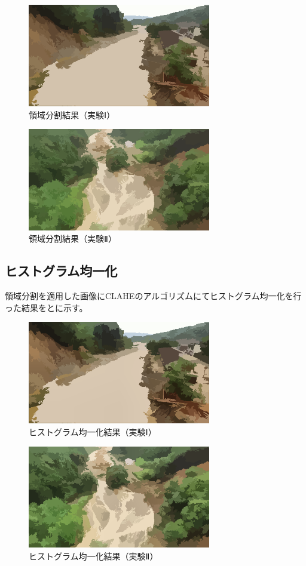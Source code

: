 \documentclass[../Thesis]{subfiles}
\begin{document}
\begin{figure}[h]
	\centering
	\includegraphics[width=8cm]{img/meanshift1.png}
	\caption{領域分割結果（実験Ⅰ）}
	\label{img03}
\end{figure}
\begin{figure}[h]
	\centering
	\includegraphics[width=8cm]{img/meanshift2.png}
	\caption{領域分割結果（実験Ⅱ）}
	\label{img04}
\end{figure}


\subsection{ヒストグラム均一化}
領域分割を適用した画像にCLAHEのアルゴリズムにてヒストグラム均一化を行った結果をとに示す。

\begin{figure}[h]
	\centering
	\includegraphics[width=8cm]{img/equalization1.png}
	\caption{ヒストグラム均一化結果（実験Ⅰ）}
	\label{img05}
\end{figure}
\begin{figure}[h]
	\centering
	\includegraphics[width=8cm]{img/equalization2.png}
	\caption{ヒストグラム均一化結果（実験Ⅱ）}
	\label{img06}
\end{figure}
\end{document}
